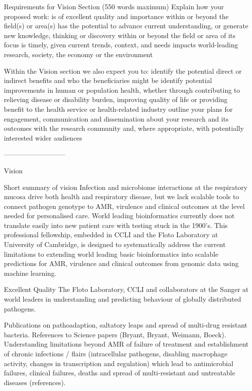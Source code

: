 Requirements for Vision Section (550 words maximum)
Explain how your proposed work:
is of excellent quality and importance within or beyond the field(s) or area(s)
has the potential to advance current understanding, or generate new knowledge, thinking or discovery within or beyond the field or area of its focus
is timely, given current trends, context, and needs
impacts world-leading research, society, the economy or the environment 

Within the Vision section we also expect you to:
identify the potential direct or indirect benefits and who the beneficiaries might be
identify potential improvements in human or population health, whether through contributing to relieving disease or disability burden, improving quality of life or providing benefit to the health service or health-related industry
outline your plans for engagement, communication and dissemination about your research and its outcomes with the research community and, where appropriate, with potentially interested wider audiences


---------------------------

Vision 

Short summary of vision
Infection and microbiome interactions at the respiratory mucosa drive both health and respiratory disease, but we lack scalable tools to connect pathogen genotype to AMR, virulence and clinical outcomes at the level needed for personalised care.  World leading bioinformatics currently does not translate easily into new patient care with testing stuck in the 1900's.  
This professional fellowship, embedded in CCLI and the Floto Laboratory at University of Cambridge, is designed to systematically address the current limitations to extending world leading basic bioinformatics into scalable predictions for AMR, virulence and clinical outcomes from genomic data using machine learning.  

Excellent Quality
The Floto Laboratory, CCLI and collaborators at the Sanger at world leaders in understanding and predicting behaviour of globally distributed pathogens.  

Publications on pathoadaption, saltatory leaps and spread of multi-drug resistant bacteria. References to Science papers (Bryant, Bryant, Weimann, Boeck). Understanding limitations beyond AMR of failure of treatment and establishment of chronic infections / flairs (intracellular pathogens, disabling macrophage activity, changes in transcription and regulation) which lead to antimicrobial failures, clinical failures, deaths and spread of multi-resistant and untreatable diseases (references).

